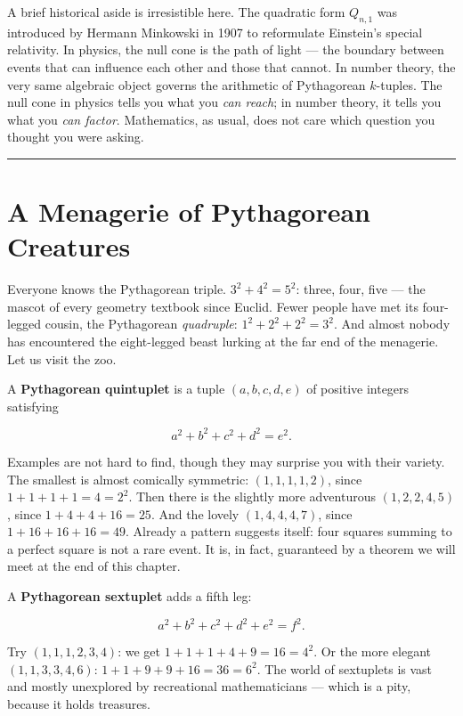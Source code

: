 \documentclass[12pt, letterpaper, openany]{book}
\theoremstyle{definition}
\theoremstyle{remark}
\begin{document}
A brief historical aside is irresistible here. The quadratic form $Q_{n,1}$ was introduced by Hermann Minkowski in 1907 to reformulate Einstein's special relativity. In physics, the null cone is the path of light --- the boundary between events that can influence each other and those that cannot. In number theory, the very same algebraic object governs the arithmetic of Pythagorean $k$-tuples. The null cone in physics tells you what you \textit{can reach}; in number theory, it tells you what you \textit{can factor}. Mathematics, as usual, does not care which question you thought you were asking.


\bigskip\noindent\rule{\textwidth}{0.4pt}\bigskip



\section*{A Menagerie of Pythagorean Creatures}


Everyone knows the Pythagorean triple. $3^2 + 4^2 = 5^2$: three, four, five --- the mascot of every geometry textbook since Euclid. Fewer people have met its four-legged cousin, the Pythagorean \textit{quadruple}: $1^2 + 2^2 + 2^2 = 3^2$. And almost nobody has encountered the eight-legged beast lurking at the far end of the menagerie. Let us visit the zoo.

A \textbf{Pythagorean quintuplet} is a tuple $(a, b, c, d, e)$ of positive integers satisfying

\[
a^2 + b^2 + c^2 + d^2 = e^2.
\]

Examples are not hard to find, though they may surprise you with their variety. The smallest is almost comically symmetric: $(1, 1, 1, 1, 2)$, since $1 + 1 + 1 + 1 = 4 = 2^2$. Then there is the slightly more adventurous $(1, 2, 2, 4, 5)$, since $1 + 4 + 4 + 16 = 25$. And the lovely $(1, 4, 4, 4, 7)$, since $1 + 16 + 16 + 16 = 49$. Already a pattern suggests itself: four squares summing to a perfect square is not a rare event. It is, in fact, guaranteed by a theorem we will meet at the end of this chapter.

A \textbf{Pythagorean sextuplet} adds a fifth leg:

\[
a^2 + b^2 + c^2 + d^2 + e^2 = f^2.
\]

Try $(1, 1, 1, 2, 3, 4)$: we get $1 + 1 + 1 + 4 + 9 = 16 = 4^2$. Or the more elegant $(1, 1, 3, 3, 4, 6)$: $1 + 1 + 9 + 9 + 16 = 36 = 6^2$. The world of sextuplets is vast and mostly unexplored by recreational mathematicians --- which is a pity, because it holds treasures.
\end{document}
